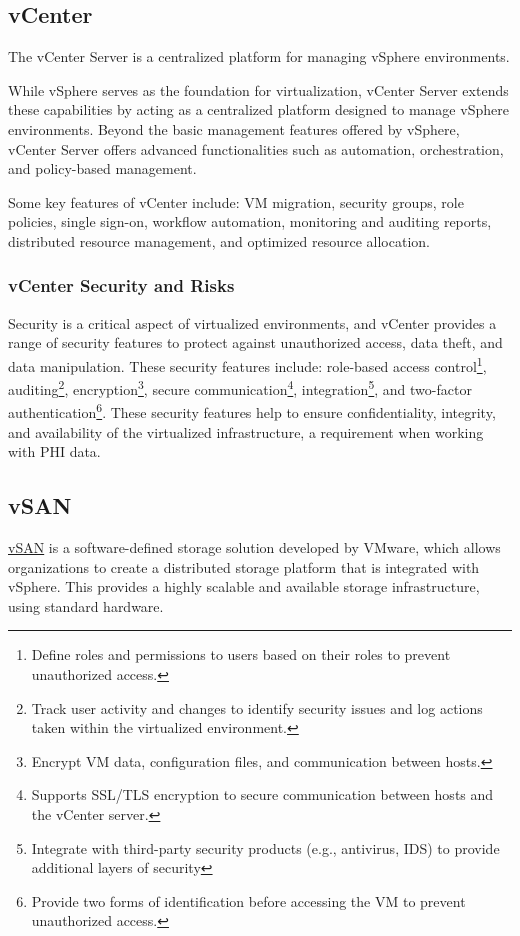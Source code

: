 \subsection{vCenter}
The vCenter Server is a centralized platform for managing vSphere environments. 

While vSphere serves as the foundation for virtualization, vCenter Server extends these capabilities by acting as a centralized platform designed to manage vSphere environments. Beyond the basic management features offered by vSphere, vCenter Server offers advanced functionalities such as automation, orchestration, and policy-based management.

Some key features of vCenter include: VM migration, security groups, role policies, single sign-on, workflow automation, monitoring and auditing reports, distributed resource management, and optimized resource allocation.

\subsubsection{vCenter Security and Risks}
Security is a critical aspect of virtualized environments, and vCenter provides a range of security features to protect against unauthorized access, data theft, and data manipulation. These security features include: role-based access control\footnote{Define roles and permissions to users based on their roles to prevent unauthorized access.}, auditing\footnote{Track user activity and changes to identify security issues and log actions taken within the virtualized environment.}, encryption\footnote{Encrypt VM data, configuration files, and communication between hosts.}, secure communication\footnote{Supports SSL/TLS encryption to secure communication between hosts and the vCenter server.}, integration\footnote{Integrate with third-party security products (e.g., antivirus, IDS) to provide additional layers of security}, and two-factor authentication\footnote{Provide two forms of identification before accessing the VM to prevent unauthorized access.}. These security features help to ensure confidentiality, integrity, and availability of the virtualized infrastructure, a requirement when working with PHI data. 

\subsection{vSAN}
\href{https://docs.vmware.com/en/VMware-vSphere/7.0/com.vmware.vsphere.vsan-planning.doc/GUID-A80526C8-A941-4F84-9D44-D4B8B3914A95.html}{vSAN} is a software-defined storage solution developed by VMware, which allows organizations to create a distributed storage platform that is integrated with vSphere. This provides a highly scalable and available storage infrastructure, using standard hardware.

